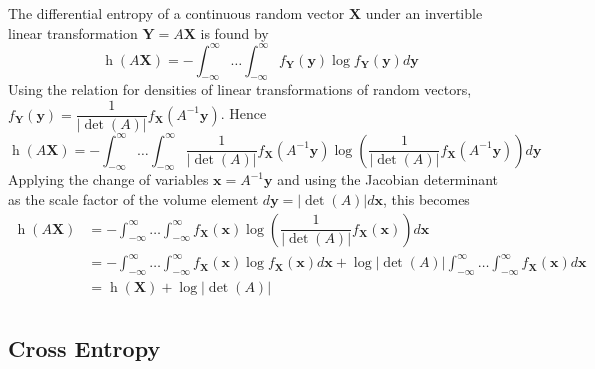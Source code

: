 \documentclass[11pt]{report} %
\begin{document}
The differential entropy of a continuous random vector $\mathbf{X}$ under an invertible linear transformation $\mathbf{Y} = A\mathbf{X}$ is found by
\begin{equation}
\operatorname{h}\left(A\mathbf{X}\right) = -\int_{-\infty}^{\infty}\dots\int_{-\infty}^{\infty}f_{\mathbf{Y}}\left(\mathbf{y}\right)\log f_{\mathbf{Y}}\left(\mathbf{y}\right) d\mathbf{y}
\end{equation}
Using the relation for densities of linear transformations of random vectors, $f_{\mathbf{Y}}\left(\mathbf{y}\right) = \dfrac{1}{\left|\operatorname{det}\left(A\right)\right|}f_{\mathbf{X}}\left(A^{-1}\mathbf{y}\right)$. Hence
\begin{equation}
\operatorname{h}\left(A\mathbf{X}\right) = -\int_{-\infty}^{\infty}\dots\int_{-\infty}^{\infty}\dfrac{1}{\left|\operatorname{det}\left(A\right)\right|}f_{\mathbf{X}}\left(A^{-1}\mathbf{y}\right)\log \left(\dfrac{1}{\left|\operatorname{det}\left(A\right)\right|}f_{\mathbf{X}}\left(A^{-1}\mathbf{y}\right)\right) d\mathbf{y}
\end{equation}
Applying the change of variables $\mathbf{x} = A^{-1}\mathbf{y}$ and using the Jacobian determinant as the scale factor of the volume element $d\mathbf{y} = \left|\operatorname{det}\left(A\right)\right|d\mathbf{x}$, this becomes
\begin{align}
\operatorname{h}\left(A\mathbf{X}\right) &= -\int_{-\infty}^{\infty}\dots\int_{-\infty}^{\infty}f_{\mathbf{X}}\left(\mathbf{x}\right)\log \left(\dfrac{1}{\left|\operatorname{det}\left(A\right)\right|}f_{\mathbf{X}}\left(\mathbf{x}\right)\right) d\mathbf{x} \\
&= -\int_{-\infty}^{\infty}\dots\int_{-\infty}^{\infty}f_{\mathbf{X}}\left(\mathbf{x}\right)\log f_{\mathbf{X}}\left(\mathbf{x}\right) d\mathbf{x} + \log\left|\operatorname{det}\left(A\right)\right|\int_{-\infty}^{\infty}\dots\int_{-\infty}^{\infty}f_{\mathbf{X}}\left(\mathbf{x}\right)d\mathbf{x} \\
&= \operatorname{h}\left(\mathbf{X}\right) + \log\left|\operatorname{det}\left(A\right)\right| \\ 
\end{align}

\subsection{Cross Entropy}
\end{document}
